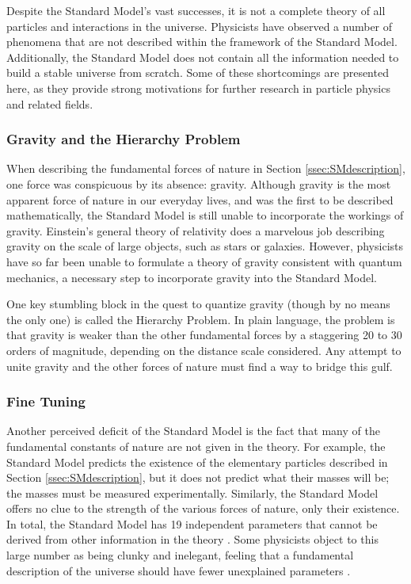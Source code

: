Despite the Standard Model's vast successes, it is not a complete
theory of all particles and interactions in the universe. Physicists
have observed a number of phenomena that are not described within the
framework of the Standard Model. Additionally, the Standard Model does
not contain all the information needed to build a stable universe from
scratch. Some of these shortcomings are presented here, as they provide
strong motivations for further research in particle physics and
related fields.

\subsubsection*{Gravity and the Hierarchy Problem}
When describing the fundamental forces of nature in Section
\ref{ssec:SMdescription}, one force was conspicuous by its absence:
gravity. Although gravity is the most apparent force of nature in our
everyday lives, and was the first to be described mathematically,
the Standard Model is still unable to incorporate the workings of
gravity. Einstein's general theory of relativity does a marvelous job
describing gravity on the scale of large objects, such as stars or
galaxies. However, physicists have so far been unable to formulate a
theory of gravity consistent with quantum mechanics, a necessary step
to incorporate gravity into the Standard Model.

One key stumbling block in the quest to quantize gravity (though by no
means the only one) is called the Hierarchy Problem. In plain language, the
problem is that gravity is weaker than the other fundamental forces by
a staggering 20 to 30 orders of magnitude, depending on the distance
scale considered. Any attempt to unite gravity and the other forces
of nature must find a way to bridge this gulf. %

\subsubsection*{Fine Tuning}
Another perceived deficit of the Standard Model is the fact that many
of the fundamental constants of nature are not given in the theory. For
example, the Standard Model predicts the existence of the elementary
particles described in Section \ref{ssec:SMdescription}, but it does
not predict what their masses will be;
the masses must be measured experimentally. Similarly, the Standard
Model offers no clue to the strength of the various forces of nature,
only their existence. In total, the Standard Model has 19 independent
parameters that cannot be derived from other information in the theory
\cite{smparams}. Some physicists object to this large number as being clunky
and inelegant, feeling that a fundamental description of the universe
should have fewer unexplained parameters \cite{griffiths}.

